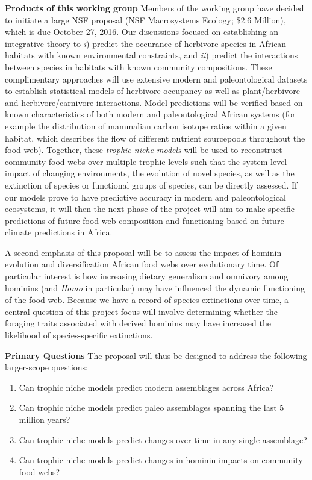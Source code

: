 \documentclass{article}[10pt]
\begin{document}
{\bf Products of this working group} Members of the working group have decided to initiate a large NSF proposal (NSF Macrosystems Ecology; \$2.6 Million), which is due October 27, 2016.
Our discussions focused on establishing an integrative theory to \emph{i}) predict the occurance of herbivore species in African habitats with known environmental constraints, and \emph{ii}) predict the interactions between species in habitats with known community compositions.
These complimentary approaches will use extensive modern and paleontological datasets to establish statistical models of herbivore occupancy as well as plant/herbivore and herbivore/carnivore interactions.
Model predictions will be verified based on known characteristics of both modern and paleontological African systems (for example the distribution of mammalian carbon isotope ratios within a given habitat, which describes the flow of different nutrient sourcepools throughout the food web).
Together, these \emph{trophic niche models} will be used to reconstruct community food webs over multiple trophic levels such that the system-level impact of changing environments, the evolution of novel species, as well as the extinction of species or functional groups of species, can be directly assessed.
If our models prove to have predictive accuracy in modern and paleontological ecosystems, it will then the next phase of the project will aim to make specific predictions of future food web composition and functioning based on future climate predictions in Africa.

A second emphasis of this proposal will be to assess the impact of hominin evolution and diversification African food webs over evolutionary time.
Of particular interest is how increasing dietary generalism and omnivory among hominins (and \emph{Homo} in particular) may have influenced the dynamic functioning of the food web.
Because we have a record of species extinctions over time, a central question of this project focus will involve determining whether the foraging traits associated with derived hominins may have increased the likelihood of species-specific extinctions.

\vspace{5 mm}

{\bf Primary Questions} The proposal will thus be designed to address the following larger-scope questions:

\begin{enumerate}
	\item Can trophic niche models predict modern assemblages across Africa?
	\item Can trophic niche models predict paleo assemblages spanning the last 5 million years?
	\item Can trophic niche models predict changes over time in any single assemblage?
	\item Can trophic niche models predict changes in hominin impacts on community food webs?
\end{enumerate}
\end{document}

